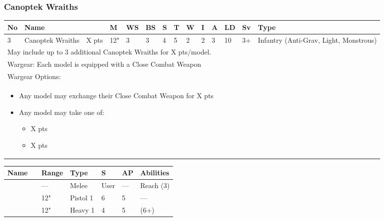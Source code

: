 \newpage
\subsubsection{Canoptek Wraiths}

\noindent
\begin{tabular}{||m{10pt} m{95pt} m{30pt} m{11pt} m{11pt} m{11pt} m{11pt} m{11pt} m{11pt} m{11pt} m{11pt} m{11pt} m{11pt} m{125pt}||}
	\hline
	No & Name & & M & WS & BS & S & T & W & I & A & LD & Sv & Type \\
	\hline
	3 & Canoptek Wraiths & X pts & 12" & 3 & 3 & 4 & 5 & 2 & 2 & 3 & 10 & 3+ & Infantry (Anti-Grav, Light, Monstrous)\\
	\hline
	\hline
	\multicolumn{14}{||Z{532 pt}||}{May include up to 3 additional Canoptek Wraiths for X pts/model.}\\		
	\hline
	\hline
	\multicolumn{14}{||Z{532 pt}||}{Wargear: Each model is equipped with a Close Combat Weapon}\\
	\multicolumn{14}{||Z{532 pt}||}{Wargear Options:} \\	\multicolumn{14}{||Z{532 pt}||}{\begin{itemize}
			\item Any model may exchange their Close Combat Weapon for \quickref{Whip Coils} \hrulefill X pts
			\item Any model may take one of:
			\begin{itemize}
				\item \quickref{Particle Caster} \hrulefill X pts
				\item \quickref{Transdimensional Beamer} \hrulefill X pts
			\end{itemize}
	\end{itemize}} \\
	\hline
\end{tabular}

\noindent
\begin{tabular}{||m{110pt} m{30pt} m{31pt} m{55pt} m{12pt} m{12pt} m{210pt}||}
	\hline
	Name & & Range & Type & S & AP & Abilities \\
	\hline
	\quickref{Whip Coils} & & — & Melee & User & — & Reach (3) \\
	\quickref{Particle Caster} & & 12" & Pistol 1 & 6 & 5 & — \\
	\quickref{Transdimensional Beamer} & & 12" & Heavy 1 & 4 & 5 & \quickref{Exile Ray} (6+) \\
	\hline
\end{tabular}

